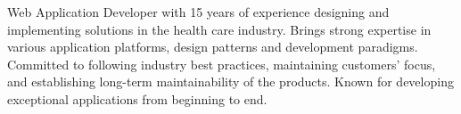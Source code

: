 

\begin{cvparagraph}

Web Application Developer with 15 years of experience designing and implementing solutions in the health care industry. Brings strong expertise in various application platforms, design patterns and development paradigms. Committed to following industry best practices, maintaining customers' focus, and establishing long-term maintainability of the products. Known for developing exceptional applications from beginning to end.
\end{cvparagraph}
